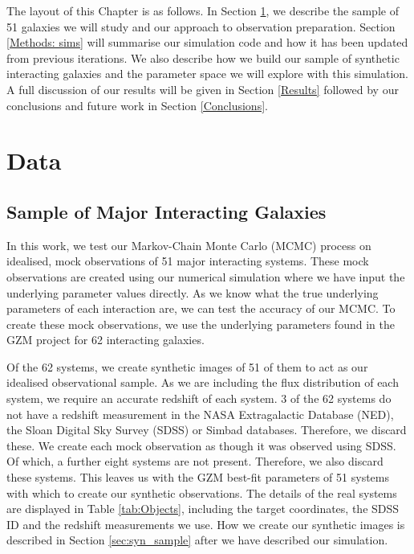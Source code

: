 The layout of this Chapter is as follows. In Section \ref{Data}, we describe the sample of 51 galaxies we will study and our approach to observation preparation. Section \ref{Methods: sims} will summarise our simulation code and how it has been updated from previous iterations. We also describe how we build our sample of synthetic interacting galaxies and the parameter space we will explore with this simulation. A full discussion of our results will be given in Section \ref{Results} followed by our conclusions and future work in Section \ref{Conclusions}.

\vspace{-5mm}
\section{Data}\label{Data}
\subsection{Sample of Major Interacting Galaxies}
\noindent In this work, we test our Markov-Chain Monte Carlo (MCMC) process on idealised, mock observations of 51 major interacting systems. These mock observations are created using our numerical simulation where we have input the underlying parameter values directly. As we know what the true underlying parameters of each interaction are, we can test the accuracy of our MCMC. To create these mock observations, we use the underlying parameters found in the GZM project for 62 interacting galaxies.

Of the 62 systems, we create synthetic images of 51 of them to act as our idealised observational sample. As we are including the flux distribution of each system, we require an accurate redshift of each system. 3 of the 62 systems do not have a redshift measurement in the NASA Extragalactic Database (NED), the Sloan Digital Sky Survey (SDSS) or Simbad databases. Therefore, we discard these. We create each mock observation as though it was observed using SDSS. Of which, a further eight systems are not present. Therefore, we also discard these systems. This leaves us with the GZM best-fit parameters of 51 systems with which to create our synthetic observations. The details of the real systems are displayed in Table \ref{tab:Objects}, including the target coordinates, the SDSS ID and the redshift measurements we use. How we create our synthetic images is described in Section \ref{sec:syn_sample} after we have described our simulation.

